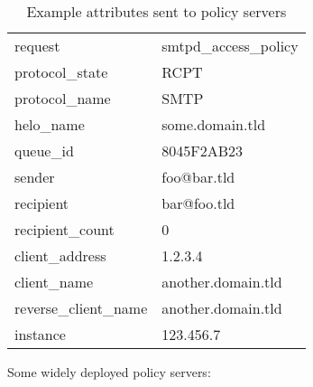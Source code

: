 \begin{table}[ht]

    \caption{Example attributes sent to policy servers}
    \empty{}\label{Example attributes sent to policy servers}

    \centering{}

    \begin{tabular}[]{ll}

        request                 & smtpd\_access\_policy     \\
        protocol\_state         & RCPT                      \\
        protocol\_name          & SMTP                      \\
        helo\_name              & some.domain.tld           \\
        queue\_id               & 8045F2AB23                \\
        sender                  & foo@bar.tld               \\
        recipient               & bar@foo.tld               \\
        recipient\_count        & 0                         \\
        client\_address         & 1.2.3.4                   \\
        client\_name            & another.domain.tld        \\
        reverse\_client\_name   & another.domain.tld        \\
        instance                & 123.456.7                 \\

    \end{tabular}

\end{table}

Some widely deployed policy servers:

